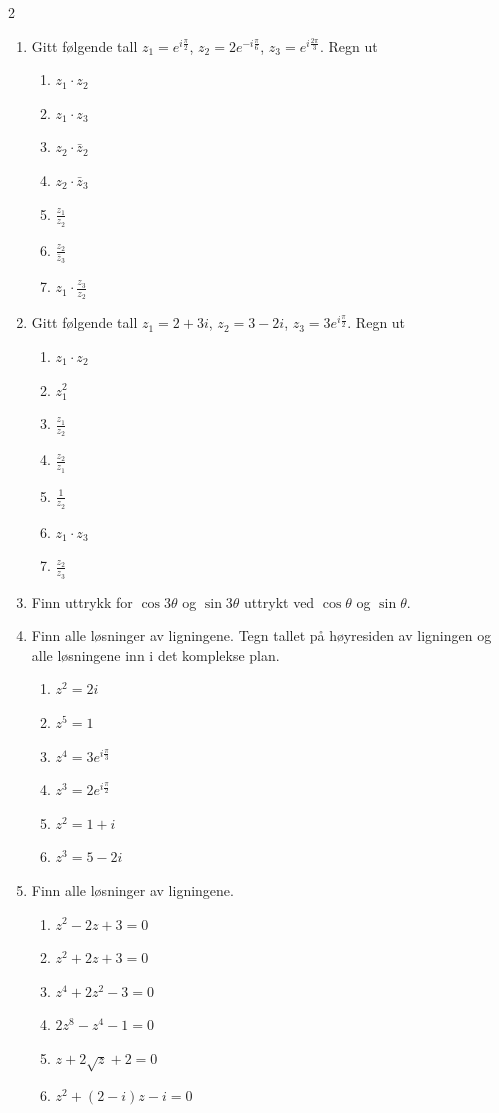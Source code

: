 \documentclass[a4paper,norsk,12pt]{article}
\begin{document}
{\begin{multicols}{2}
\begin{enumerate}
\item
Gitt følgende tall $z_1 = e^{i\frac{\pi}{2}}$, $z_2 = 2e^{-i\frac{\pi}{6}}$, $z_3 = e^{i\frac{2\pi}{3}}$. Regn ut
\begin{enumerate}[label=\alph*)]
\item
$z_1\cdot z_2$
\item
$z_1 \cdot z_3$
\item
$z_2\cdot\bar{z}_2$
\item
$z_2\cdot \bar{z}_3$
\item
$\frac{z_1}{z_2}$
\item
$\frac{z_2}{\bar{z}_3}$
\item
$z_1\cdot\frac{z_3}{z_2}$
\end{enumerate}
\item
Gitt følgende tall $z_1 = 2+3i$, $z_2=3-2i$, $z_3 = 3e^{i\frac{\pi}{2}}$. Regn ut
\begin{enumerate}[label=\alph*)]
\item
$z_1\cdot z_2$
\item
$z_1^2$
\item
$\frac{z_1}{z_2}$
\item
$\frac{z_2}{z_1}$
\item
$\frac{1}{z_2}$
\item
$z_1\cdot z_3$
\item
$\frac{z_2}{z_3}$
\end{enumerate}
\item
Finn uttrykk for $\cos3\theta$ og $\sin3\theta$ uttrykt ved $\cos\theta$ og $\sin\theta$.
\item
Finn alle løsninger av ligningene. Tegn tallet på høyresiden av ligningen og alle løsningene inn i det komplekse plan.
\begin{enumerate}[label=\alph*)]
\item
$z^2 = 2i$
\item
$z^5 = 1$
\item
$z^4 = 3e^{i\frac{\pi}{3}}$
\item
$z^3 = 2e^{i\frac{\pi}{2}}$
\item
$z^2 = 1+i$
\item
$z^3 = 5-2i$
\end{enumerate}
\columnbreak
\item
Finn alle løsninger av ligningene.
\begin{enumerate}[label=\alph*)]
\item
$z^2 - 2z + 3 = 0 $
\item
$z^2 + 2z + 3 = 0$
\item
$z^4 +2z^2 - 3 = 0$
\item
$2z^8 - z^4 - 1 = 0$
\item
$z  + 2\sqrt{z}+2 = 0$
\item
$z^2 + (2-i)z - i = 0$

\end{enumerate}
\end{enumerate}
\end{multicols}
}
\end{document}
